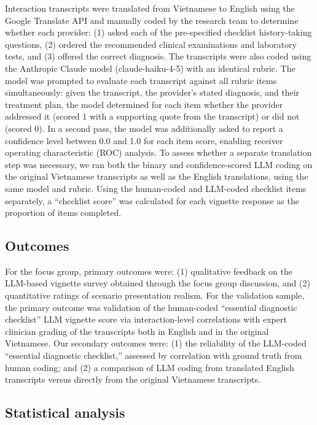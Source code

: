 \documentclass{article}
\begin{document}
Interaction transcripts were translated from Vietnamese to English using the Google Translate API and manually coded by the research team to determine whether each provider: (1) asked each of the pre-specified checklist history-taking questions, (2) ordered the recommended clinical examinations and laboratory tests, and (3) offered the correct diagnosis. The transcripts were also coded using the Anthropic Claude model (claude-haiku-4-5) with an identical rubric. The model was prompted to evaluate each transcript against all rubric items simultaneously: given the transcript, the provider's stated diagnosis, and their treatment plan, the model determined for each item whether the provider addressed it (scored 1 with a supporting quote from the transcript) or did not (scored 0). In a second pass, the model was additionally asked to report a confidence level between 0.0 and 1.0 for each item score, enabling receiver operating characteristic (ROC) analysis. To assess whether a separate translation step was necessary, we ran both the binary and confidence-scored LLM coding on the original Vietnamese transcripts as well as the English translations, using the same model and rubric. Using the human-coded and LLM-coded checklist items separately, a ``checklist score'' was calculated for each vignette response as the proportion of items completed.

\subsection{Outcomes}

For the focus group, primary outcomes were: (1) qualitative feedback on the LLM-based vignette survey obtained through the focus group discussion, and (2) quantitative ratings of scenario presentation realism. For the validation sample, the primary outcome was validation of the human-coded ``essential diagnostic checklist'' LLM vignette score via interaction-level correlations with expert clinician grading of the transcripts both in English and in the original Vietnamese. Our secondary outcomes were: (1) the reliability of the LLM-coded ``essential diagnostic checklist,'' assessed by correlation with ground truth from human coding; and (2) a comparison of LLM coding from translated English transcripts versus directly from the original Vietnamese transcripts.

\subsection{Statistical analysis}
\end{document}
